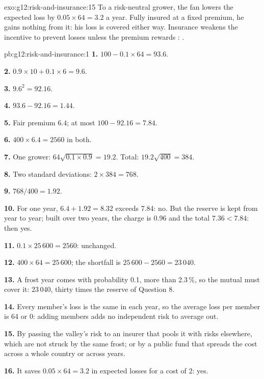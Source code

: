 \begin{solution}{exo:g12:risk-and-insurance:15}
To a risk-neutral grower, the fan lowers the expected loss by $0.05 \times 64 = 3.2$ a year. Fully insured at a fixed premium, he gains nothing from it: his loss is covered
either way. Insurance weakens the incentive to prevent losses unless the premium rewards : .
\end{solution}

\begin{solution}{pb:g12:risk-and-insurance:1}
\textbf{1.} $100 - 0.1 \times 64 = 93.6$.

\textbf{2.} $0.9 \times 10 + 0.1 \times 6 = 9.6$.

\textbf{3.} $9.6^2 = 92.16$.

\textbf{4.} $93.6 - 92.16 = 1.44$.

\textbf{5.} Fair premium $6.4$; at most $100 - 92.16 = 7.84$.

\textbf{6.} $400 \times 6.4 = 2560$ in both.

\textbf{7.} One grower: $64\sqrt{0.1 \times 0.9} = 19.2$. Total: $19.2\sqrt{400} = 384$.

\textbf{8.} Two standard deviations: $2 \times 384 = 768$.

\textbf{9.} $768/400 = 1.92$.

\textbf{10.} For one year, $6.4 + 1.92 = 8.32$ exceeds 7.84: no. But the reserve is kept from year to year; built over two years, the charge is 0.96 and the total $7.36 < 7.84$:
then yes.

\textbf{11.} $0.1 \times 25\,600 = 2560$: unchanged.

\textbf{12.} $400 \times 64 = 25\,600$; the shortfall is $25\,600 - 2560 = 23\,040$.

\textbf{13.} A frost year comes with probability 0.1, more than 2.3\,\%, so the mutual must cover it: 23\,040, thirty times the reserve of Question 8.

\textbf{14.} Every member's loss is the same in each year, so the average loss per member is 64 or 0: adding members adds no independent risk to average out.

\textbf{15.} By passing the valley's risk to an insurer that pools it with risks elsewhere, which are not struck by the same frost; or by a public fund that spreads the
cost across a whole country or across years.

\textbf{16.} It saves $0.05 \times 64 = 3.2$ in expected losses for a cost of 2: yes.


\end{solution}
